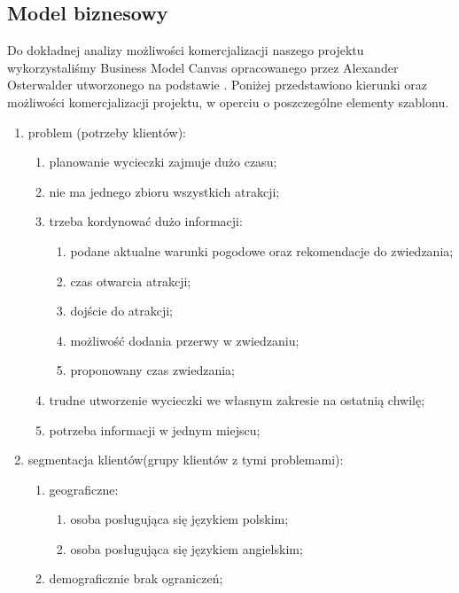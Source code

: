 \subsection{Model biznesowy}
\label{sec:aspekty-biznesowy}

Do dokładnej analizy możliwości komercjalizacji naszego projektu wykorzystaliśmy Business Model Canvas opracowanego przez Alexander Osterwalder  utworzonego na podstawie \cite{bmc}.
Poniżej przedstawiono kierunki oraz możliwości komercjalizacji projektu, w operciu o poszczególne elementy szablonu.
\begin{enumerate}[label=\Roman*.]
    \item problem (potrzeby klientów):
    \begin{enumerate}[label=\alph*.]
        \item planowanie wycieczki zajmuje dużo czasu;
        \item nie ma jednego zbioru wszystkich atrakcji;
        \item trzeba kordynować dużo informacji:
        \begin{enumerate}[label=\roman*.]
            \item podane aktualne warunki pogodowe oraz rekomendacje do zwiedzania;
            \item czas otwarcia atrakcji;
            \item dojście do atrakcji;
            \item możliwość dodania przerwy w zwiedzaniu;
            \item proponowany czas zwiedzania;
        \end{enumerate}
        \item trudne utworzenie wycieczki we własnym zakresie na ostatnią chwilę;
        \item potrzeba informacji w jednym miejscu;
    \end{enumerate}
    \item segmentacja klientów(grupy klientów z tymi problemami):
    \begin{enumerate}[label=\alph*.]
        \item geograficzne:
        \begin{enumerate}[label=\roman*.]
            \item osoba posługująca się językiem polskim;
            \item osoba posługująca się językiem angielskim;
        \end{enumerate}
        \item demograficznie brak ograniczeń;

\end{enumerate}
\end{enumerate}
